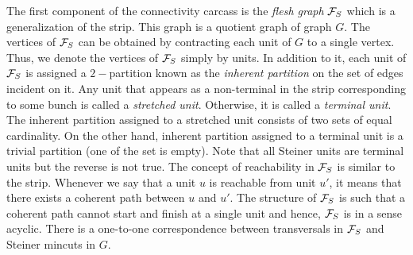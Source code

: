 The first component of the connectivity carcass is the \textit{flesh graph} ${\cal F}_S$ which is a generalization of the strip. This graph is a quotient graph of graph $G$. The vertices of ${\cal F}_S$ can be obtained by contracting each unit of $G$ to a single vertex. Thus, we denote the vertices of ${\cal F}_S$ simply by units. In addition to it, each unit of ${\cal F}_S$ is assigned a $2-$partition known as the \textit{inherent partition} on the set of edges incident on it. Any unit that appears as a non-terminal in the strip corresponding to some bunch is called a \textit{stretched unit}. Otherwise, it is called a \textit{terminal unit}. 
The inherent partition assigned to a stretched unit consists of two sets of equal cardinality. On the other hand, inherent partition assigned to a terminal unit is a trivial partition (one of the set is empty). Note that all Steiner units are terminal units but the reverse is not true.
The concept of reachability in ${\cal F}_S$ is similar to the strip. Whenever we say that a unit $u$ is reachable from unit $u'$, it means that there exists a coherent path between $u$ and $u'$. The structure of ${\cal F}_S$ is such that a coherent path cannot start and finish at a single unit and hence, ${\cal F}_S$ is in a sense acyclic. There is a one-to-one correspondence between transversals in ${\cal F}_S$ and Steiner mincuts in $G$.

